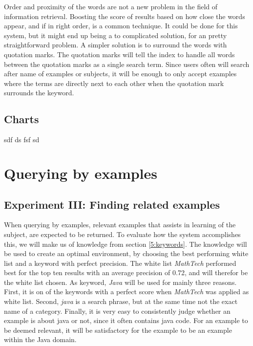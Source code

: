 Order and proximity of the words are not a new problem in the field of information retrieval. Boosting the score of results based on how close the words appear, and if in right order, is a common technique. It could be done for this system, but it might end up being a to complicated solution, for an pretty straightforward problem. A simpler solution is to surround the words with quotation marks. The quotation marks will tell the index to handle all words between the quotation marks as a single search term. Since users often will search after name of examples or subjects, it will be enough to only accept examples where the terms are directly next to each other when the quotation mark surrounds the keyword.



\subsection{Charts}

sdf
ds
fsf
sd
\section{Querying by examples}

\subsection{Experiment III: Finding related examples}

When querying by examples, relevant examples that assists in learning of the subject, are expected to be returned. To evaluate how the system accomplishes this, we will make us of knowledge from section \ref{5:keywords}. The knowledge will be used to create an optimal environment, by choosing the best performing white list and a keyword with perfect precision. The white list \textit{MathTech} performed best for the top ten results with an average precision of 0.72, and will therefor be the white list chosen. As keyword, \textit{Java} will be used for mainly three reasons. First, it is on of the keywords with a perfect score when \textit{MathTech} was applied as white list. Second, \textit{java} is a search phrase, but at the same time not the exact name of a category. Finally, it is very easy to consistently judge whether an example is about java or not, since it often contains java code. For an example to be deemed relevant, it will be satisfactory for the example to be an example within the Java domain. 

